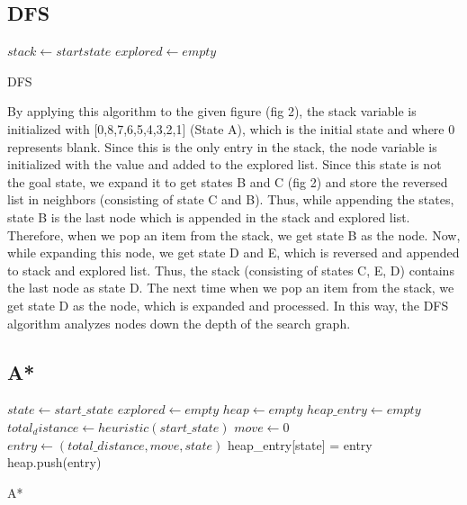 \documentclass{svproc}
\begin{document}
\subsection{DFS}

\begin{algorithm}[H]
	\SetAlgoLined
	$stack \gets start state$\;
	$explored \gets empty$\;
	\caption{DFS}
\end{algorithm}

\noindent By applying this algorithm to the given figure (fig 2), the stack variable is initialized with [0,8,7,6,5,4,3,2,1] (State A), which is the initial state and where 0 represents blank. Since this is the only entry in the stack, the node variable is initialized with the value and added to the explored list. Since this state is not the goal state, we expand it to get states B and C (fig 2) and store the reversed list in neighbors (consisting of state C and B). Thus, while appending the states, state B is the last node which is appended in the stack and explored list. Therefore, when we pop an item from the stack, we get state B as the node. Now, while expanding this node, we get state D and E, which is reversed and appended to stack and explored list. Thus, the stack (consisting of states C, E, D) contains the last node as state D. The next time when we pop an item from the stack, we get state D as the node, which is expanded and processed. In this way, the DFS algorithm analyzes nodes down the depth of the search graph.


\subsection{A*}

\begin{algorithm}[H]
	\SetAlgoLined
	$state \gets start\_state$\;
	$explored \gets empty$\;
	$heap \gets empty$\;
	$heap\_entry \gets empty$\;
	$total_distance \gets heuristic(start\_state)$\;
	$move \gets 0$\;
	$entry \gets (total\_distance, move, state)$\;
	heap\_entry[state] = entry\;
	heap.push(entry)\;
	\caption{A*}
\end{algorithm}
\end{document}
